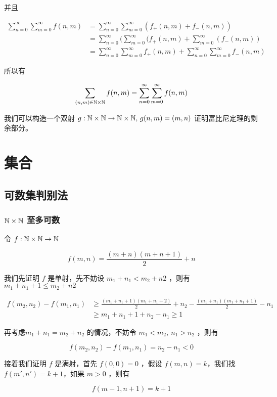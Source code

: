 并且


\begin{align*}
\sum_{n=0}^{\infty}\sum_{m=0}^{\infty}f(n,m) &= \sum_{n=0}^{\infty}\sum_{m=0}^{\infty}(f_+(n,m) + f_-(n,m)) \\
&= \sum_{n=0}^{\infty}(\sum_{m=0}^{\infty}(f_+(n,m) + \sum_{m=0}^{\infty}(f_-(n,m)) \\
&= \sum_{n=0}^{\infty}\sum_{m=0}^{\infty}f_+(n,m) + \sum_{n=0}^{\infty}\sum_{m=0}^{\infty}f_-(n,m)
\end{align*}

所以有 


\[
\sum_{(n,m) \in \mathbb{N} \times \mathbb{N}}f(n,m) = \sum_{n=0}^{\infty}\sum_{m=0}^{\infty}f(n,m) 
\]

我们可以构造一个双射 $g: \mathbb{N} \times \mathbb{N} \to \mathbb{N} \times \mathbb{N},\, g(n,m) = (m,n)$ 证明富比尼定理的剩余部分。


\chapter{集合}

\section{可数集判别法}

\subsection{$\mathbb{N} \times \mathbb{N}$ 至多可数}

令 $f: \mathbb{N} \times \mathbb{N} \to \mathbb{N}$

\[
f(m,n) = \frac{(m+n)(m+n+1)}{2} + n
\]

我们先证明 $f$ 是单射，先不妨设 $m_1+ n_1 < m_2 + n2$ ，则有 $ m_1+ n_1 + 1 \le m_2 + n2$

\begin{align*}
f(m_2, n_2) - f(m_1, n_1) & \ge \frac{(m_1+n_1+1)(m_1+n_1 + 2)}{2} + n_2 - \frac{(m_1+n_1)(m_1+n_1+1)}{2} - n_1 \\
    & \ge m_1+n_1+1 + n_2 - n_1 \ge 1
\end{align*}

再考虑$m_1 + n_1 = m_2 + n_2$ 的情况，不妨令 $m_1 < m_2, \: n_1 > n_2$ ，则有

\[
f(m_2,n_2) - f(m_1, n_1) = n_2 - n_1 < 0
\]

接着我们证明 $f$ 是满射，首先 $f(0, 0) = 0$ ，假设 $f(m,n) = k$，我们找 $f(m',n') = k+1$，如果 $m > 0$ ，则有 

\[
f(m-1,n+1) = k +1
\]

